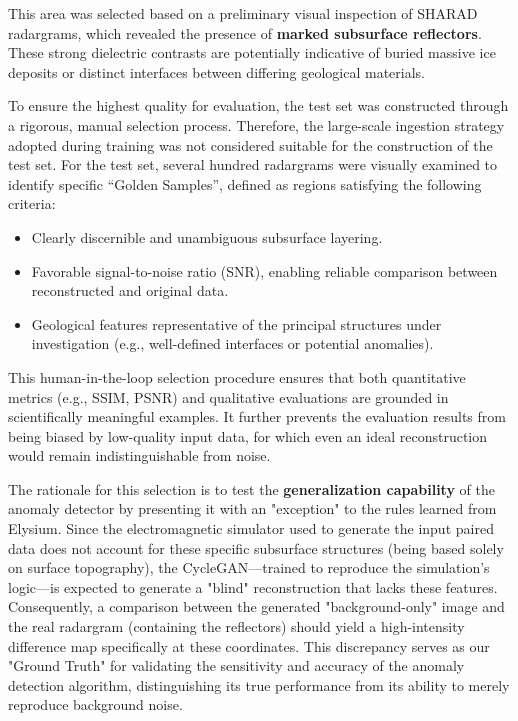 This area was selected based on a preliminary visual inspection of SHARAD radargrams, which revealed the presence of \textbf{marked subsurface reflectors}.
These strong dielectric contrasts are potentially indicative of buried massive ice deposits or distinct interfaces between differing geological materials.

To ensure the highest quality for evaluation, the test set was constructed through a rigorous, manual selection process.
Therefore, the large-scale ingestion strategy adopted during training was not considered suitable for the construction of the test set.
For the test set, several hundred radargrams were visually examined to identify specific \enquote{Golden Samples}, defined as regions satisfying the following criteria:

\begin{itemize}
    \item Clearly discernible and unambiguous subsurface layering.
    \item Favorable signal-to-noise ratio (SNR), enabling reliable comparison between reconstructed and original data.
    \item Geological features representative of the principal structures under investigation (e.g., well-defined interfaces or potential anomalies).
\end{itemize}

This human-in-the-loop selection procedure ensures that both quantitative metrics (e.g., SSIM, PSNR) and qualitative evaluations are grounded in scientifically meaningful examples.
It further prevents the evaluation results from being biased by low-quality input data, for which even an ideal reconstruction would remain indistinguishable from noise.

The rationale for this selection is to test the \textbf{generalization capability} of the anomaly detector by presenting it with an "exception" to the rules learned from Elysium.
Since the electromagnetic simulator used to generate the input paired data does not account for these specific subsurface structures (being based solely on surface topography), the CycleGAN—trained to reproduce the simulation's logic—is expected to generate a "blind" reconstruction that lacks these features.
Consequently, a comparison between the generated "background-only" image and the real radargram (containing the reflectors) should yield a high-intensity difference map specifically at these coordinates.
This discrepancy serves as our "Ground Truth" for validating the sensitivity and accuracy of the anomaly detection algorithm, distinguishing its true performance from its ability to merely reproduce background noise.


